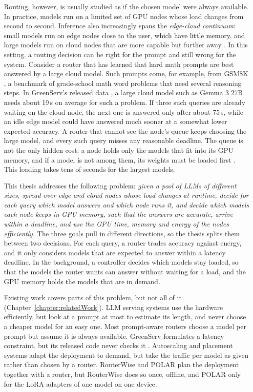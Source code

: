 Routing, however, is usually studied as if the chosen model were always available.
In practice, models run on a limited set of GPU nodes whose load changes from second to second.
Inference also increasingly spans the \emph{edge-cloud continuum}: small models run on edge nodes close to the user, which have little memory, and large models run on cloud nodes that are more capable but further away \cite{clone}.
In this setting, a routing decision can be right for the prompt and still wrong for the system.
Consider a router that has learned that hard math prompts are best answered by a large cloud model.
Such prompts come, for example, from GSM8K \cite{gsm8k}, a benchmark of grade-school math word problems that need several reasoning steps.
In GreenServ's released data \cite{greenserv_code}, a large cloud model such as Gemma 3 27B needs about 19\,s on average for such a problem.
If three such queries are already waiting on the cloud node, the next one is answered only after about 75\,s, while an idle edge model could have answered much sooner at a somewhat lower expected accuracy.
A router that cannot see the node's queue keeps choosing the large model, and every such query misses any reasonable deadline.
The queue is not the only hidden cost: a node holds only the models that fit into its GPU memory, and if a model is not among them, its weights must be loaded first \cite{llm_serving_survey}.
This loading takes tens of seconds for the largest models.

This thesis addresses the following problem: \emph{given a pool of LLMs of different sizes, spread over edge and cloud nodes whose load changes at runtime, decide for each query which model answers and which node runs it, and decide which models each node keeps in GPU memory, such that the answers are accurate, arrive within a deadline, and use the GPU time, memory and energy of the nodes efficiently.}
The three goals pull in different directions, so the thesis splits them between two decisions.
For each query, a router trades accuracy against energy, and it only considers models that are expected to answer within a latency deadline.
In the background, a controller decides which models stay loaded, so that the models the router wants can answer without waiting for a load, and the GPU memory holds the models that are in demand.

Existing work covers parts of this problem, but not all of it (Chapter~\ref{chapter:relatedWork}).
LLM serving systems \cite{bros, econoserve, dynamollm, nexussched} use the hardware efficiently, but look at a prompt at most to estimate its length, and never choose a cheaper model for an easy one.
Most prompt-aware routers choose a model per prompt but assume it is always available.
GreenServ formulates a latency constraint, but its released code never checks it \cite{greenserv_code}.
Autoscaling and placement systems \cite{alpaserve, warmserve, enova, hasgpu, sageserve} adapt the deployment to demand, but take the traffic per model as given rather than chosen by a router.
RouterWise \cite{routerwise} and POLAR \cite{polar} plan the deployment together with a router, but RouterWise does so once, offline, and POLAR only for the LoRA adapters of one model on one device.

